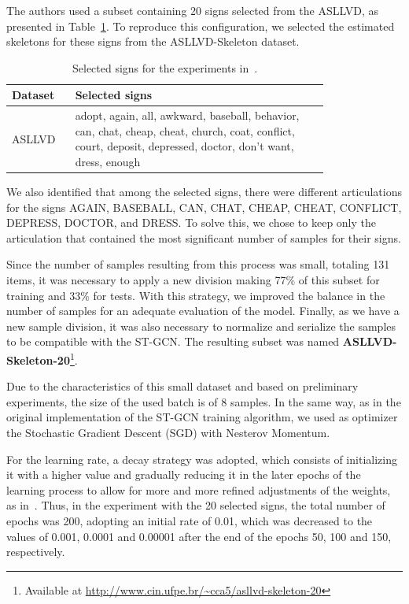 The authors used a subset containing 20 signs selected from the ASLLVD, as presented in Table~\ref{tab:asllvd-20}. To reproduce this configuration, we selected the estimated skeletons for these signs from the ASLLVD-Skeleton dataset. 
\begin{table}[ht]
\centering
\caption{Selected signs for the experiments in~\cite{lim-2016}.}
\label{tab:asllvd-20}
\begin{tabular}{ l | p{0.8\linewidth} }
\hline
Dataset & Selected signs \\ \hline
ASLLVD & adopt, again, all, awkward, baseball, behavior, can, chat, cheap, cheat, church, coat, conflict, court, deposit, depressed, doctor, don’t want, dress, enough \\ \hline
\end{tabular}
\end{table}

We also identified that among the selected signs, there were different articulations for the signs AGAIN, BASEBALL, CAN, CHAT, CHEAP, CHEAT, CONFLICT, DEPRESS, DOCTOR, and DRESS. To solve this, we chose to keep only the articulation that contained the most significant number of samples for their signs.

Since the number of samples resulting from this process was small, totaling 131 items, it was necessary to apply a new division making 77\% of this subset for training and 33\% for tests. With this strategy, we improved the balance in the number of samples for an adequate evaluation of the model. Finally, as we have a new sample division, it was also necessary to normalize and serialize the samples to be compatible with the ST-GCN. 
The resulting subset was named \textbf{ASLLVD-Skeleton-20}\footnote{ Available at \url{http://www.cin.ufpe.br/~cca5/asllvd-skeleton-20} }. 

Due to the characteristics of this small dataset and based on preliminary experiments, the size of the used batch is of 8 samples.  In the same way, as in the original implementation of the ST-GCN training algorithm, we used as optimizer the Stochastic Gradient Descent (SGD) with Nesterov Momentum. 

For the learning rate, a decay strategy was adopted, which consists of initializing it with a higher value and gradually reducing it in the later epochs of the learning process to allow for more and more refined adjustments of the weights, as in~\cite{st-gcn-2018}. Thus, in the experiment with the 20 selected signs, the total number of epochs was 200, adopting an initial rate of 0.01, which was decreased to the values of 0.001, 0.0001 and 0.00001 after the end of the epochs 50, 100 and 150, respectively.

